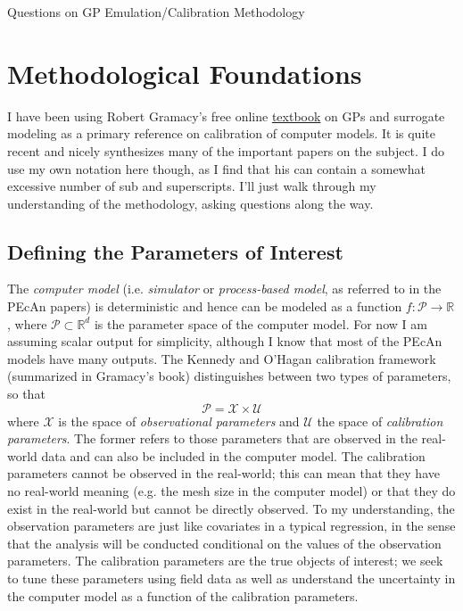 \documentclass[12pt]{article}
\newcommand{\R}{\mathcal{R}}
\def\R{\mathbb{R}}
\begin{document}
\begin{center}
\Large
Questions on GP Emulation/Calibration Methodology 
\end{center}

\section{Methodological Foundations}
I have been using Robert Gramacy's free online \href{https://bobby.gramacy.com/surrogates/}{textbook} on GPs and surrogate modeling as a primary reference on calibration of 
computer models. It is quite recent and nicely synthesizes many of the important papers on the subject. I do use my own notation here though, as I find that his can contain a somewhat
excessive number of sub and superscripts. I'll just walk through my understanding of the methodology, asking questions along the way. 

\subsection{Defining the Parameters of Interest}
The \textit{computer model} (i.e. \textit{simulator} or \textit{process-based model}, as referred to in the PEcAn papers) is deterministic and hence can be modeled as a function
$f: \mathcal{P} \to \R$, where $\mathcal{P} \subset \R^d$ is the parameter space of the computer model. For now I am assuming scalar output for simplicity, although I know that 
most of the PEcAn models have many outputs. The Kennedy and O'Hagan calibration framework (summarized in Gramacy's book) distinguishes between two types of parameters, so 
that 
\[\mathcal{P} = \mathcal{X} \times \mathcal{U}\]
where $\mathcal{X}$ is the space of \textit{observational parameters} and $\mathcal{U}$ the space of \textit{calibration parameters}. The former refers to those parameters that are 
observed in the real-world data and can also be included in the computer model. The calibration parameters cannot be observed in the real-world; this can mean that they have no 
real-world meaning (e.g. the mesh size in the computer model) or that they do exist in the real-world but cannot be directly observed. To my understanding, the observation parameters
are just like covariates in a typical regression, in the sense that the analysis will be conducted conditional on the values of the observation parameters. The calibration parameters are 
the true objects of interest; we seek to tune these parameters using field data as well as understand the uncertainty in the computer model as a function of the calibration parameters. 
\end{document}
